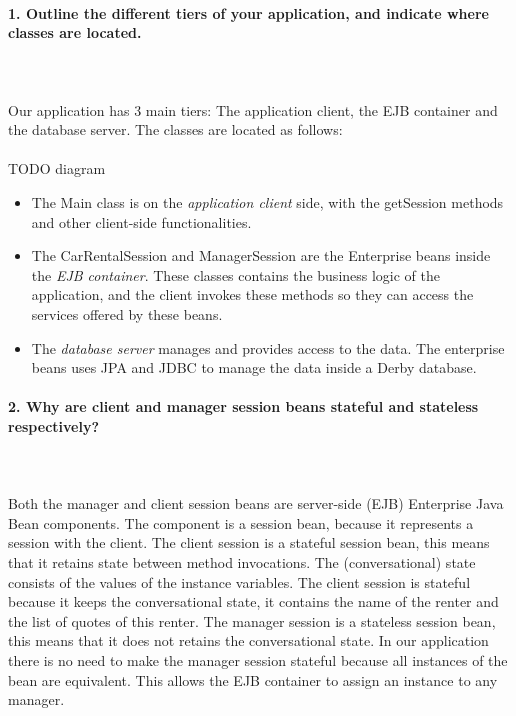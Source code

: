 \documentclass{ds-report}
\begin{document}
	\maketitle

	\paragraph{1. Outline the different tiers of your application, and indicate where classes are located.} \mbox{}\\\\
Our application has 3 main tiers: The application client, the EJB container and the database server. The classes are located as follows:\mbox{}\\\\

TODO diagram

\begin{itemize}
  \item The Main class is on the \emph{application client} side, with the getSession methods and other client-side functionalities.
  \item The CarRentalSession and ManagerSession are the Enterprise beans inside the \emph{EJB container}. These classes contains the business logic of the application, and the client invokes these methods so they can access the services offered by these beans.
  \item The \emph{database server} manages and provides access to the data. The enterprise beans uses JPA and JDBC to manage the data inside a Derby database.
\end{itemize}

	
	\paragraph{2. Why are client and manager session beans stateful and stateless respectively?} \mbox{}\\\\
Both the manager and client session beans are server-side (EJB) Enterprise Java Bean components. The component is a session bean, because it represents a session with the client.
The client session is a stateful session bean, this means that it retains state between method invocations. The (conversational) state consists of the values of the instance variables. The client session is stateful because it keeps the conversational state, it contains the name of the renter and the list of quotes of this renter.
The manager session is a stateless session bean, this means that it does not retains the conversational state. In our application there is no need to make the manager session stateful because all instances of the bean are equivalent. This allows the EJB container to assign an instance to any manager.
\end{document}
